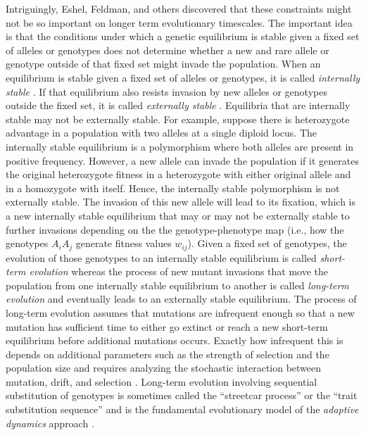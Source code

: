 \documentclass[11pt]{article}
\begin{document}
Intriguingly, Eshel, Feldman, and others discovered that these constraints might not be so important on longer term evolutionary timescales. The important idea is that the conditions under which a genetic equilibrium is stable given a fixed set of alleles or genotypes does not determine whether a new and rare allele or genotype outside of that fixed set might invade the population. When an equilibrium is stable given a fixed set of alleles or genotypes, it is called \textit{internally stable} \cite{Eshel:1996}. If that equilibrium also resists invasion by new alleles or genotypes outside the fixed set, it is called \textit{externally stable} \cite{Liberman:1988,Eshel:1996}. Equilibria that are internally stable may not be externally stable. For example, suppose there is heterozygote advantage in a population with two alleles at a single diploid locus. The internally stable equilibrium is a polymorphism where both alleles are present in positive frequency. However, a new allele can invade the population if it generates the original heterozygote fitness in a heterozygote with either original allele and in a homozygote with itself. Hence, the internally stable polymorphism is not externally stable. The invasion of this new allele will lead to its fixation, which is a new internally stable equilibrium that may or may not be externally stable to further invasions depending on the the genotype-phenotype map (i.e., how the genotypes $A_{i} A_{j}$ generate fitness values $w_{ij}$). Given a fixed set of genotypes, the evolution of those genotypes to an internally stable equilibrium is called \textit{short-term evolution} whereas the process of new mutant invasions that move the population from one internally stable equilibrium to another is called \textit{long-term evolution} \cite{Eshel:1991,Eshel:1996,Hammerstein:1996,Weissing:1996,Eshel:Feldman:1998,VanCleve:2015,VanCleve:2020} and eventually leads to an externally stable equilibrium. The process of long-term evolution assumes that mutations are infrequent enough so that a new mutation has sufficient time to either go extinct or reach a new short-term equilibrium before additional mutations occurs. Exactly how infrequent this is depends on additional parameters such as the strength of selection and the population size and requires analyzing the stochastic interaction between mutation, drift, and selection \cite{Gillespie:1991,Champagnat:2006,Champagnat:Ferriere:2006,Desai:Fisher:2007}. Long-term evolution involving sequential substitution of genotypes is sometimes called the ``streetcar process'' \cite{Hammerstein:1996} or the ``trait substitution sequence'' \cite{Metz:Nisbet:1992,Dieckmann:Law:1996,Champagnat:Ferriere:2001} and is the fundamental evolutionary model of the \textit{adaptive dynamics} approach \cite{Metz:Geritz:1996,Geritz:Kisdi:1998,Dercole:Rinaldi:2008}.
\end{document}
